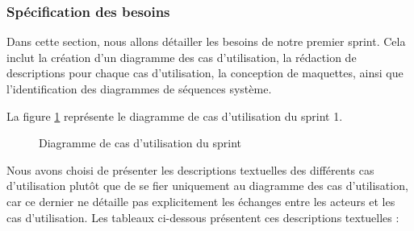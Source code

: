 
\subsubsection{Spécification des besoins}
Dans cette section, nous allons détailler les besoins de notre premier sprint. Cela inclut la création d'un diagramme des cas d'utilisation, la rédaction de descriptions pour chaque cas d'utilisation, la conception de maquettes, ainsi que l'identification des diagrammes de séquences système.

La figure \ref{fig:UseCaseDiagram1} représente le diagramme de cas d'utilisation du sprint 1.

\begin{figure}[H]
  \centering
  \caption{Diagramme de cas d'utilisation du sprint }
  \label{fig:UseCaseDiagram1}
\end{figure}


Nous avons choisi de présenter les descriptions textuelles des différents cas d'utilisation plutôt que de se fier uniquement au diagramme des cas d'utilisation, car ce dernier ne détaille pas explicitement les échanges entre les acteurs et les cas d'utilisation. Les tableaux ci-dessous présentent ces descriptions textuelles :



